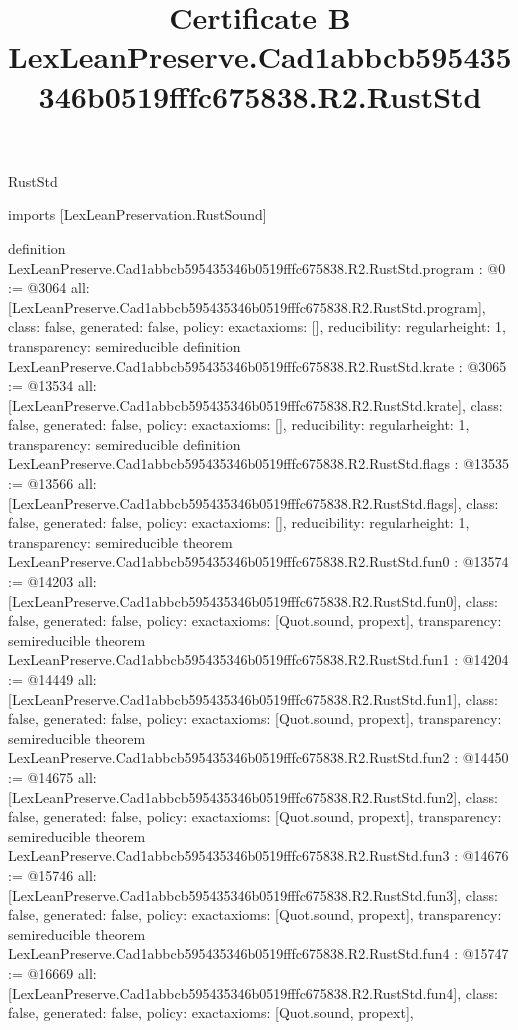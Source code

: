 \begin{lexlean}{RustStd}
\title{Certificate B LexLeanPreserve.Cad1abbcb595435346b0519fffc675838.R2.RustStd}
\begin{coremodule}
imports [LexLeanPreservation.RustSound]

definition LexLeanPreserve.Cad1abbcb595435346b0519fffc675838.R2.RustStd.program : @0 := @3064 {
  all: [LexLeanPreserve.Cad1abbcb595435346b0519fffc675838.R2.RustStd.program],
  class: false,
  generated: false,
  policy: exact{axioms: []},
  reducibility: regular{height: 1},
  transparency: semireducible
}
definition LexLeanPreserve.Cad1abbcb595435346b0519fffc675838.R2.RustStd.krate : @3065 := @13534 {
  all: [LexLeanPreserve.Cad1abbcb595435346b0519fffc675838.R2.RustStd.krate],
  class: false,
  generated: false,
  policy: exact{axioms: []},
  reducibility: regular{height: 1},
  transparency: semireducible
}
definition LexLeanPreserve.Cad1abbcb595435346b0519fffc675838.R2.RustStd.flags : @13535 := @13566 {
  all: [LexLeanPreserve.Cad1abbcb595435346b0519fffc675838.R2.RustStd.flags],
  class: false,
  generated: false,
  policy: exact{axioms: []},
  reducibility: regular{height: 1},
  transparency: semireducible
}
theorem LexLeanPreserve.Cad1abbcb595435346b0519fffc675838.R2.RustStd.fun0 : @13574 := @14203 {
  all: [LexLeanPreserve.Cad1abbcb595435346b0519fffc675838.R2.RustStd.fun0],
  class: false,
  generated: false,
  policy: exact{axioms: [Quot.sound, propext]},
  transparency: semireducible
}
theorem LexLeanPreserve.Cad1abbcb595435346b0519fffc675838.R2.RustStd.fun1 : @14204 := @14449 {
  all: [LexLeanPreserve.Cad1abbcb595435346b0519fffc675838.R2.RustStd.fun1],
  class: false,
  generated: false,
  policy: exact{axioms: [Quot.sound, propext]},
  transparency: semireducible
}
theorem LexLeanPreserve.Cad1abbcb595435346b0519fffc675838.R2.RustStd.fun2 : @14450 := @14675 {
  all: [LexLeanPreserve.Cad1abbcb595435346b0519fffc675838.R2.RustStd.fun2],
  class: false,
  generated: false,
  policy: exact{axioms: [Quot.sound, propext]},
  transparency: semireducible
}
theorem LexLeanPreserve.Cad1abbcb595435346b0519fffc675838.R2.RustStd.fun3 : @14676 := @15746 {
  all: [LexLeanPreserve.Cad1abbcb595435346b0519fffc675838.R2.RustStd.fun3],
  class: false,
  generated: false,
  policy: exact{axioms: [Quot.sound, propext]},
  transparency: semireducible
}
theorem LexLeanPreserve.Cad1abbcb595435346b0519fffc675838.R2.RustStd.fun4 : @15747 := @16669 {
  all: [LexLeanPreserve.Cad1abbcb595435346b0519fffc675838.R2.RustStd.fun4],
  class: false,
  generated: false,
  policy: exact{axioms: [Quot.sound, propext]},
}
\end{coremodule}
\end{lexlean}
